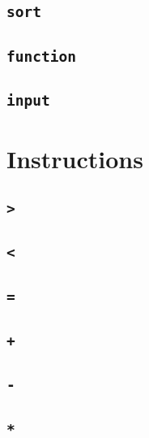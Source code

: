 \INCOMPLETE

\subsection{\texttt{sort}}

\INCOMPLETE

\subsection{\texttt{function}}

\INCOMPLETE

\subsection{\texttt{input}}

\INCOMPLETE

\section{Instructions}

\subsection{\texttt{>}}

\INCOMPLETE

\subsection{\texttt{<}}

\INCOMPLETE

\subsection{\texttt{=}}

\INCOMPLETE

\subsection{\texttt{+}}

\INCOMPLETE

\subsection{\texttt{-}}

\INCOMPLETE

\subsection{\texttt{*}}

